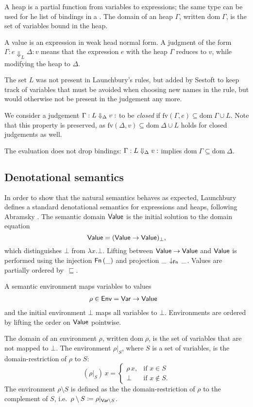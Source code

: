\documentclass{jfp1}
\theoremstyle{nonumberbreak}
\newcommand{\sVar}   {\text{\textsf{Var}}}
\newcommand{\sValue} {\text{\textsf{Value}}}
\newcommand{\sEnv}   {\text{\textsf{Env}}}
\newcommand{\sFn}[1]{\text{\textsf{Fn}}\,(#1)}
\newcommand{\sFnProj}[2]{#1\,\downarrow_{\text{\textsf{Fn}}}\,#2}
\newcommand{\keyword}[1]{\text{\textsf{#1}}}
\newcommand{\sred}[5]{#1 : #2 \Downarrow_{#3} #4 : #5}
\newcommand{\sRule}[1]{\text{{\textsc{#1}}}}
\newcommand{\fv}[1]{\text{fv}(#1)}
\newcommand{\dom}[1]{\text{dom}\;#1}
\begin{document}
A heap is a partial function from variables to expressions; the same type can be used for he list of bindings in a \keyword{let}. The domain of an heap $\Gamma$, written $\dom\Gamma$, is the set of variables bound in the heap.

A value is an expression in weak head normal form. A judgment of the form $\sred \Gamma e L \Delta v$ means that the expression $e$ with the heap $\Gamma$ reduces to $v$, while modifying the heap to $\Delta$.

The set $L$ was not present in Launchbury's rules, but added by Sestoft  to keep track of variables that must be avoided when choosing new names in the \sRule{Let} rule, but would otherwise not be present in the judgement any more.

We consider a judgement $\sred \Gamma L \Delta v$ to be \emph{closed} if $\fv{\Gamma, e} \subseteq \dom \Gamma \cup L$. Note that this property is preserved, as $\fv{\Delta, v} \subseteq \dom \Delta \cup L$ holds for closed judgements as well.

The evaluation does not drop bindings: $\sred \Gamma L \Delta v$ implies $\dom \Gamma \subseteq \dom \Delta$.

\subsection{Denotational semantics}

In order to show that the natural semantics behaves as expected, Launchbury defines a standard denotational semantics for expressions and heaps, following Abramsky . The semantic domain $\sValue$ is the initial solution to the domain equation
\[
\sValue = (\sValue \to \sValue)_\bot,
\]
which distinguishes $\bot$ from $\lambda x. \bot$. Lifting between $\sValue \to \sValue$ and $\sValue$ is performed using the injection $\sFn \_$ and projection $\sFnProj{\_}{\_}$. Values are partially ordered by~$\sqsubseteq$.

A semantic environment maps variables to values
\begin{alignat*}{2}
\rho \in \sEnv &= \sVar \to \sValue
\end{alignat*}
and the initial environment $\bot$ maps all variables to $\bot$. Environments are ordered by lifting the order on $\sValue$ pointwise.

The domain of an environment $\rho$, written $\dom\rho$, is the set of variables that are not mapped to $\bot$.
The environment $\rho|_S$, where $S$ is a set of variables, is the domain-restriction of $\rho$ to $S$:
\[
(\rho |_S)\, x = 
\begin{cases}
\rho\, x,& \text{if } x \in S\\
\bot& \text{if } x \not\in S.
\end{cases}
\]
The environment $\rho\setminus S$ is defined as the the domain-restriction of $\rho$ to the complement of $S$, i.e.\ \mbox{$\rho\setminus S \coloneqq \rho|_{\sVar \setminus S}$}.
\end{document}
